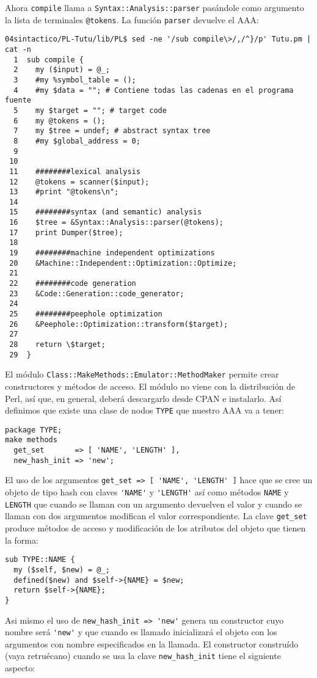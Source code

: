 Ahora \verb|compile| llama a \verb|Syntax::Analysis::parser| pasándole
como argumento la lista de terminales \verb|@tokens|. La función \verb|parser|
devuelve el AAA:
\begin{verbatim}
04sintactico/PL-Tutu/lib/PL$ sed -ne '/sub compile\>/,/^}/p' Tutu.pm | cat -n
  1  sub compile {
  2    my ($input) = @_;
  3    #my %symbol_table = ();
  4    #my $data = ""; # Contiene todas las cadenas en el programa fuente
  5    my $target = ""; # target code
  6    my @tokens = ();
  7    my $tree = undef; # abstract syntax tree
  8    #my $global_address = 0;
  9
 10
 11    ########lexical analysis
 12    @tokens = scanner($input);
 13    #print "@tokens\n";
 14
 15    ########syntax (and semantic) analysis
 16    $tree = &Syntax::Analysis::parser(@tokens);
 17    print Dumper($tree);
 18
 19    ########machine independent optimizations
 20    &Machine::Independent::Optimization::Optimize;
 21
 22    ########code generation
 23    &Code::Generation::code_generator;
 24
 25    ########peephole optimization
 26    &Peephole::Optimization::transform($target);
 27
 28    return \$target;
 29  }
\end{verbatim}
El módulo \verb|Class::MakeMethods::Emulator::MethodMaker|
permite crear constructores y métodos de acceso.
El módulo no viene con la distribución de Perl, así que, en general, deberá 
descargarlo desde CPAN e instalarlo.
Así definimos que existe una clase de nodos \verb|TYPE|
que nuestro AAA va a tener:

\begin{verbatim}
package TYPE;
make methods
  get_set       => [ 'NAME', 'LENGTH' ],
  new_hash_init => 'new';
\end{verbatim}

El uso de los argumentos \verb|get_set => [ 'NAME', 'LENGTH' ]|
hace que se cree un objeto de tipo hash  con claves 
\verb|'NAME'| y \verb|'LENGTH'| así como métodos \verb|NAME|
y \verb|LENGTH| que cuando se llaman con un argumento devuelven
el valor y cuando se llaman con dos argumentos modifican el
valor correspondiente. 
La clave \verb|get_set| produce métodos de acceso
y modificación de los atributos del objeto que
tienen la forma:

\begin{verbatim}
sub TYPE::NAME {
  my ($self, $new) = @_;
  defined($new) and $self->{NAME} = $new;
  return $self->{NAME};
}
\end{verbatim}

Asi mismo el uso de \verb|new_hash_init => 'new'|
genera un constructor cuyo nombre
será \verb|'new'| y que cuando es llamado inicializará el
objeto con los argumentos con nombre especificados en la llamada.
El constructor construído (vaya retruécano) cuando se usa la clave
\verb|new_hash_init| tiene el siguiente aspecto:

